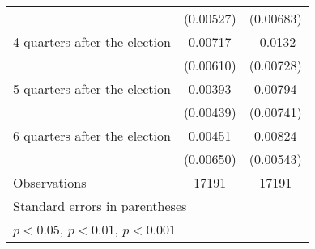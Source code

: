 \begin{table}[htbp]
\begin{tabular}{l*{2}{c}}
                    &   (0.00527)         &   (0.00683)         \\
[1em]
 4 quarters after the election&     0.00717         &     -0.0132         \\
                    &   (0.00610)         &   (0.00728)         \\
[1em]
 5 quarters after the election&     0.00393         &     0.00794         \\
                    &   (0.00439)         &   (0.00741)         \\
[1em]
 6 quarters after the election&     0.00451         &     0.00824         \\
                    &   (0.00650)         &   (0.00543)         \\
\hline
Observations        &       17191         &       17191         \\
\hline\hline
\multicolumn{3}{l}{\footnotesize Standard errors in parentheses}\\
\multicolumn{3}{l}{\footnotesize \sym{*} \(p<0.05\), \sym{**} \(p<0.01\), \sym{***} \(p<0.001\)}\\
\end{tabular}
\end{table}

